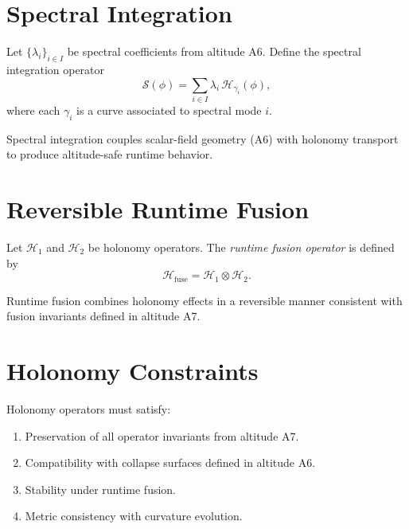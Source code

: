 \documentclass[12pt]{article}
\begin{document}
\section{Spectral Integration}

\begin{definition}
Let $\{ \lambda_i \}_{i \in I}$ be spectral coefficients from altitude A6. Define
the spectral integration operator
\[
\mathcal{S}(\phi) = \sum_{i \in I} \lambda_i \, \mathcal{H}_{\gamma_i}(\phi),
\]
where each $\gamma_i$ is a curve associated to spectral mode $i$.
\end{definition}

\begin{remark}
Spectral integration couples scalar-field geometry (A6) with holonomy transport
to produce altitude-safe runtime behavior.
\end{remark}

\section{Reversible Runtime Fusion}

\begin{definition}
Let $\mathcal{H}_1$ and $\mathcal{H}_2$ be holonomy operators. The
\emph{runtime fusion operator} is defined by
\[
\mathcal{H}_{\mathrm{fuse}} = \mathcal{H}_1 \otimes \mathcal{H}_2.
\]
\end{definition}

\begin{remark}
Runtime fusion combines holonomy effects in a reversible manner consistent with
fusion invariants defined in altitude A7.
\end{remark}

\section{Holonomy Constraints}

\begin{definition}
Holonomy operators must satisfy:
\begin{enumerate}
    \item Preservation of all operator invariants from altitude A7.
    \item Compatibility with collapse surfaces defined in altitude A6.
    \item Stability under runtime fusion.
    \item Metric consistency with curvature evolution.
\end{enumerate}
\end{definition}
\end{document}
